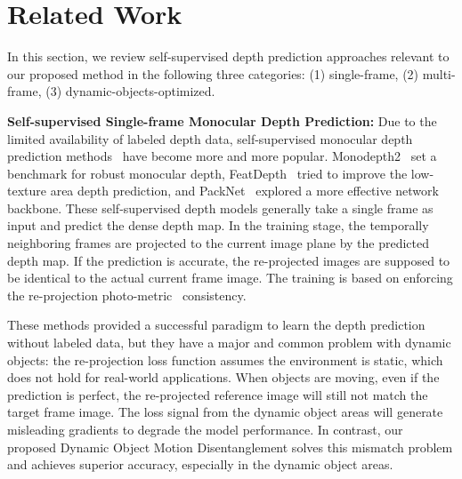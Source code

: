 \documentclass[runningheads]{llncs}
\begin{document}
\section{Related Work}
In this section, we review self-supervised depth prediction approaches relevant to our proposed method in the following three categories: (1) single-frame, (2) multi-frame, (3) dynamic-objects-optimized. 

\textbf{Self-supervised Single-frame Monocular Depth Prediction: }Due to the limited availability of labeled depth data, self-supervised monocular depth prediction methods~\cite{monodepth,monodepth2,featdepth,casser2018depth,li2020unsupervised,packnet} have become more and more popular. Monodepth2~\cite{monodepth2} set a benchmark for robust monocular depth, FeatDepth~\cite{featdepth} tried to improve the low-texture area depth prediction, and PackNet~\cite{packnet} explored a more effective network backbone. These self-supervised depth models generally take a single frame as input and predict the dense depth map. In the training stage, the temporally neighboring frames are projected to the current image plane by the predicted depth map. If the prediction is accurate, the re-projected images are supposed to be identical to the actual current frame image. The training is based on enforcing the re-projection photo-metric~\cite{ssim} consistency.

These methods provided a successful paradigm to learn the depth prediction without labeled data, but they have a major and common problem with dynamic objects: the re-projection loss function assumes the environment is static, which does not hold for real-world applications. When objects are moving, even if the prediction is perfect, the re-projected reference image will still not match the target frame image. The loss signal from the dynamic object areas will generate misleading gradients to degrade the model performance. In contrast, our proposed Dynamic Object Motion Disentanglement solves this mismatch problem and achieves superior accuracy, especially in the dynamic object areas.
\end{document}
